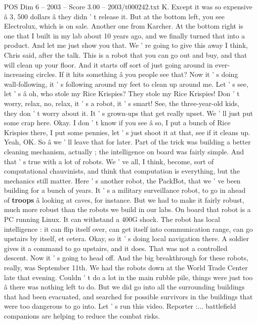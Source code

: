 \begin{textsample}{POS Dim 6 – 2003 – Score 3.00 – 2003/t000242.txt}
K.
Except it was so expensive â 3, 500 dollars â they didn ' t release it.
But at the bottom left, you see Electrolux, which is on sale.
Another one from Karcher.
At the bottom right is one that I built in my lab about 10 years ago, and we finally turned that into a product.
And let me just show you that.
We ' re going to give this away I think, Chris said, after the talk.
This is a robot that you can go out and buy, and that will clean up your floor.
And it starts off sort of just going around in ever-increasing circles.
If it hits something â you people see that?
Now it ' s doing wall-following, it ' s following around my feet to clean up around me.
Let ' s see, let ' s â oh, who stole my Rice Krispies?
They stole my Rice Krispies!
Don ' t worry, relax, no, relax, it ' s a robot, it ' s smart!
See, the three-year-old kids, they don ' t worry about it.
It ' s grown-ups that get really upset.
We ' ll just put some crap here.
Okay.
I don ' t know if you see â so, I put a bunch of Rice Krispies there, I put some pennies, let ' s just shoot it at that, see if it cleans up.
Yeah, OK.
So â we ' ll leave that for later.
Part of the trick was building a better cleaning mechanism, actually ; the intelligence on board was fairly simple.
And that ' s true with a lot of robots.
We ' ve all, I think, become, sort of computational chauvinists, and think that computation is everything, but the mechanics still matter.
Here ' s another robot, the PackBot, that we ' ve been building for a bunch of years.
It ' s a military surveillance robot, to go in ahead of \textbf{troops} â looking at caves, for instance.
But we had to make it fairly robust, much more robust than the robots we build in our labs.
On board that robot is a PC running Linux.
It can withstand a 400G shock.
The robot has local intelligence : it can flip itself over, can get itself into communication range, can go upstairs by itself, et cetera.
Okay, so it ' s doing local navigation there.
A soldier gives it a command to go upstairs, and it does.
That was not a controlled descent.
Now it ' s going to head off.
And the big breakthrough for these robots, really, was September 11th.
We had the robots down at the World Trade Center late that evening.
Couldn ' t do a lot in the main rubble pile, things were just too â there was nothing left to do.
But we did go into all the surrounding buildings that had been evacuated, and searched for possible survivors in the buildings that were too dangerous to go into.
Let ' s run this video.
Reporter :... battlefield companions are helping to reduce the combat risks.

\end{textsample}
